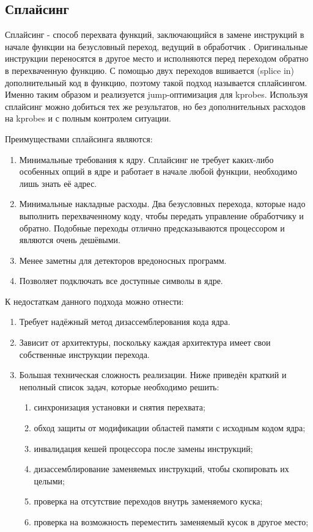 	\subsection{Сплайсинг}
		Сплайсинг - способ перехвата функций, заключающийся в замене инструкций в начале функции
		на безусловный переход, ведущий в обработчик \cite{splice-hooking}. 
		Оригинальные инструкции переносятся в другое место и исполняются перед переходом обратно в перехваченную функцию.
		С помощью двух переходов вшивается (splice in) дополнительный код в функцию, поэтому такой подход называется сплайсингом.
		Именно таким образом и реализуется jump-оптимизация для kprobes. 
		Используя сплайсинг можно добиться тех же результатов, но без дополнительных расходов на kprobes и с полным контролем ситуации.
		
		Преимуществами сплайсинга являются:
		\begin{enumerate}
			\item Минимальные требования к ядру. 
				Сплайсинг не требует каких-либо особенных опций в ядре и работает в начале любой функции, 
				необходимо лишь знать её адрес.
			\item Минимальные накладные расходы. 
				Два безусловных перехода, которые надо выполнить перехваченному коду, чтобы передать управление обработчику и обратно.
				Подобные переходы отлично предсказываются процессором и являются очень дешёвыми.
			\item Менее заметны для детекторов вредоносных программ.
			\item Позволяет подключать все доступные символы в ядре.
		\end{enumerate}
		
		К недостаткам данного подхода можно отнести:
		\begin{enumerate}
			\item Требует надёжный метод дизассемблерования кода ядра.
			\item Зависит от архитектуры, поскольку каждая архитектура имеет свои собственные инструкции перехода.
			\item Большая техническая сложность реализации. Ниже приведён краткий и неполный список задач, которые необходимо решить:
			\begin{enumerate}
				\item синхронизация установки и снятия перехвата;
				\item обход защиты от модификации областей памяти с исходным кодом ядра;
				\item инвалидация кешей процессора после замены инструкций;
				\item дизассемблирование заменяемых инструкций, чтобы скопировать их целыми;
				\item проверка на отсутствие переходов внутрь заменяемого куска;
				\item проверка на возможность переместить заменяемый кусок в другое место;
			\end{enumerate}
		\end{enumerate}

